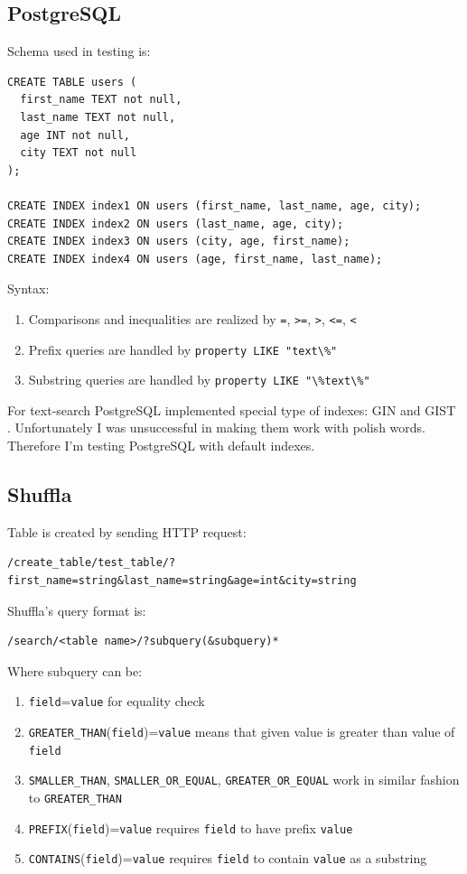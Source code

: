 \documentclass[10pt,a4paper]{article}
\begin{document}
\subsection{PostgreSQL}

Schema used in testing is:

\begin{verbatim}
CREATE TABLE users (
  first_name TEXT not null,
  last_name TEXT not null,
  age INT not null,
  city TEXT not null
);

CREATE INDEX index1 ON users (first_name, last_name, age, city);
CREATE INDEX index2 ON users (last_name, age, city);
CREATE INDEX index3 ON users (city, age, first_name);
CREATE INDEX index4 ON users (age, first_name, last_name);
\end{verbatim}

Syntax:
\begin{enumerate}
\item Comparisons and inequalities are realized by \verb|=|, \verb|>=|, \verb|>|, \verb|<=|, \verb|<|
\item Prefix queries are handled by \verb|property LIKE "text\%"|
\item Substring queries are handled by \verb|property LIKE "\%text\%"|
\end{enumerate}

For text-search PostgreSQL implemented special type of indexes: GIN \cite{PSQLGIN} and GIST \cite{PSQLGIST}. Unfortunately I was unsuccessful in making them work with polish words. Therefore I'm testing PostgreSQL with default indexes.

\subsection{Shuffla}

Table is created by sending HTTP request:
\begin{verbatim}
/create_table/test_table/?first_name=string&last_name=string&age=int&city=string
\end{verbatim}
Shuffla's query format is:

\begin{verbatim}
/search/<table name>/?subquery(&subquery)*
\end{verbatim}
Where subquery can be:
\begin{enumerate}
\item \verb|field|=\verb|value| for equality check
\item \verb|GREATER_THAN|(\verb|field|)=\verb|value| means that given value is greater than value of \verb|field| 
\item \verb|SMALLER_THAN|, \verb|SMALLER_OR_EQUAL|, \verb|GREATER_OR_EQUAL| work in similar fashion to \verb|GREATER_THAN|
\item \verb|PREFIX|(\verb|field|)=\verb|value| requires \verb|field| to have prefix \verb|value|
\item \verb|CONTAINS|(\verb|field|)=\verb|value| requires \verb|field| to contain \verb|value| as a substring
\end{enumerate}
\end{document}
